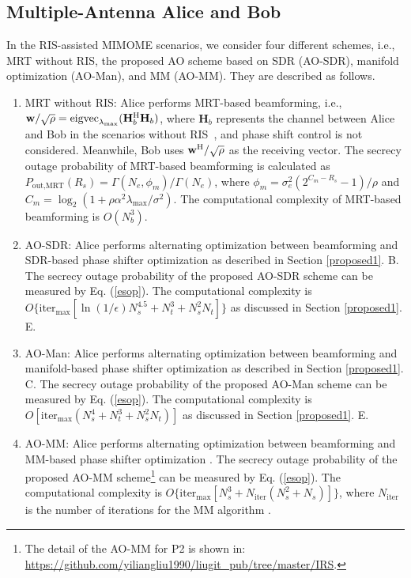 \documentclass[journal]{IEEEtran}
\theoremstyle{definition}
\begin{document}
\subsection{Multiple-Antenna Alice and Bob}
In the RIS-assisted MIMOME scenarios, we consider four different schemes, i.e., MRT without RIS, the proposed AO scheme based on SDR (AO-SDR),  manifold optimization (AO-Man), and MM (AO-MM). They are described as follows.

\begin{enumerate}
\item MRT without RIS: Alice performs MRT-based beamforming, i.e., $\mathbf{w}/\sqrt{\rho}=\text{eigvec}_{\lambda_{\max}}(\mathbf{H}_b^{\rm{H}}\mathbf{H}_b)$,  where $\mathbf{H}_b$ represents the channel between Alice and Bob in the scenarios without RIS~\cite{Kang2003}, and phase shift control is not considered. Meanwhile, Bob uses $\mathbf{w}^{\rm{H}}/\sqrt{\rho}$ as the receiving vector. The secrecy outage probability of MRT-based beamforming is calculated as $P_{\text{out,MRT}}(R_s)=\Gamma(N_e,\phi_m)/\Gamma(N_e)$, where $\phi_{m}= \sigma_e^2(2^{C_{m}-R_s}-1)/\rho$ and $C_m=\log_2(1+\rho\alpha^2\lambda_{\max}/\sigma^2)$. The computational complexity of MRT-based beamforming is $O(N_b^3)$.
\item AO-SDR: Alice performs alternating optimization between beamforming and SDR-based phase shifter optimization as described in Section \ref{proposed1}. B. The secrecy outage probability of the proposed AO-SDR scheme can be measured by Eq. (\ref{esop}).  The computational complexity is $O\{\text{iter}_{\max}[\ln(1/\epsilon)N_s^{4.5}+N_t^3+N_s^2N_t]\}$ as discussed in Section \ref{proposed1}. E.
\item AO-Man: Alice performs alternating optimization between beamforming and manifold-based phase shifter optimization as described in Section \ref{proposed1}. C. The secrecy outage probability of the proposed AO-Man scheme can be measured by Eq. (\ref{esop}). The computational complexity is $O[\text{iter}_{\max}(N_s^4+N_t^3+N_s^2N_t)]$ as discussed in Section \ref{proposed1}. E. 
\item AO-MM: Alice performs alternating optimization between beamforming and MM-based phase shifter optimization \cite{HongAN2020}. The secrecy outage probability of the proposed AO-MM scheme\footnote{The detail of  the AO-MM for P2 is shown in: \url{https://github.com/yiliangliu1990/liugit_pub/tree/master/IRS}.} can be measured by Eq. (\ref{esop}). The computational complexity is $O\{\text{iter}_{\max}[N_s^3+N_{\text{iter}}(N_s^2+N_s)]\}$, where $N_{\text{iter}}$ is the number of iterations for the MM algorithm \cite{HongAN2020}. 
\end{enumerate}
\end{document}
